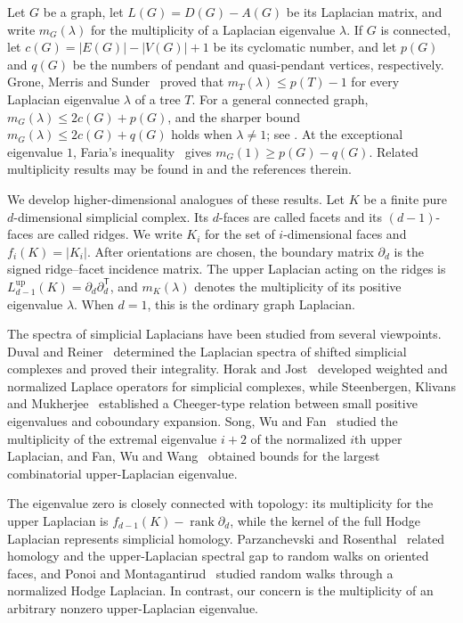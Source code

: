 \documentclass[12pt]{article}
\theoremstyle{remark}
\begin{document}
Let $G$ be a graph, let $L(G)=D(G)-A(G)$ be its Laplacian matrix, and write
$m_G(\lambda)$ for the multiplicity of a Laplacian eigenvalue $\lambda$.  If
$G$ is connected, let $c(G)=|E(G)|-|V(G)|+1$ be its cyclomatic number, and let
$p(G)$ and $q(G)$ be the numbers of pendant and quasi-pendant vertices,
respectively.  Grone, Merris and Sunder~\cite{GMS} proved that
$m_T(\lambda)\le p(T)-1$ for every Laplacian eigenvalue $\lambda$ of a tree
$T$.  For a general connected graph,
$m_G(\lambda)\le2c(G)+p(G)$, and the sharper bound
$m_G(\lambda)\le2c(G)+q(G)$ holds when $\lambda\ne1$; see
\cite{ChenGuoWang,GuptaQuasi}.  At the exceptional eigenvalue $1$, Faria's
inequality~\cite{Faria} gives $m_G(1)\ge p(G)-q(G)$.  Related multiplicity
results may be found in
\cite{Barik,GuoFengZhang,Andrade,AkbariKianiMirzakhah,TianWangSong} and the
references therein.

We develop higher-dimensional analogues of these results.  Let $K$ be a finite
pure $d$-dimensional simplicial complex.  Its $d$-faces are called facets and
its $(d-1)$-faces are called ridges.  We write $K_i$ for the set of
$i$-dimensional faces and $f_i(K)=|K_i|$.  After orientations are chosen, the
boundary matrix $\partial_d$ is the signed ridge--facet incidence matrix.  The
upper Laplacian acting on the ridges is
$L_{d-1}^{\mathrm{up}}(K)=\partial_d\partial_d^{\mathsf T}$, and
$m_K(\lambda)$ denotes the multiplicity of its positive eigenvalue $\lambda$.
When $d=1$, this is the ordinary graph Laplacian.

The spectra of simplicial Laplacians have been studied from several
viewpoints.  Duval and Reiner~\cite{DuvalReiner} determined the Laplacian
spectra of shifted simplicial complexes and proved their integrality.  Horak
and Jost~\cite{HorakJost} developed weighted and normalized Laplace operators
for simplicial complexes, while Steenbergen, Klivans and
Mukherjee~\cite{SteenbergenKlivansMukherjee} established a Cheeger-type
relation between small positive eigenvalues and coboundary expansion.  Song,
Wu and Fan~\cite{SongWuFan} studied the multiplicity of the extremal
eigenvalue $i+2$ of the normalized $i$th upper Laplacian, and Fan, Wu and
Wang~\cite{FanWuWang} obtained bounds for the largest combinatorial
upper-Laplacian eigenvalue.

The eigenvalue zero is closely connected with topology: its multiplicity for
the upper Laplacian is $f_{d-1}(K)-\operatorname{rank}\partial_d$, while the
kernel of the full Hodge Laplacian represents simplicial homology.
Parzanchevski and Rosenthal~\cite{ParzanchevskiRosenthal} related homology and
the upper-Laplacian spectral gap to random walks on oriented faces, and Ponoi
and Montagantirud~\cite{PonoiMontagantirud} studied random walks through a
normalized Hodge Laplacian.  In contrast, our concern is the multiplicity of
an arbitrary nonzero upper-Laplacian eigenvalue.
\end{document}
